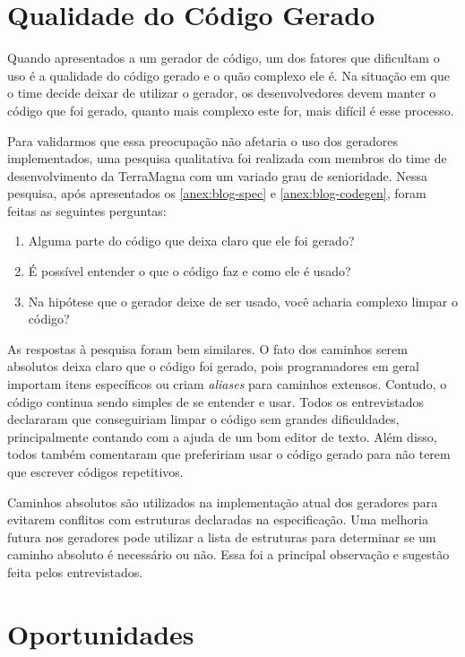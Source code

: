 \section{Qualidade do Código Gerado}

Quando apresentados a um gerador de código, um dos fatores que dificultam o uso é a qualidade
do código gerado e o quão complexo ele é. Na situação em que o time decide deixar de utilizar
o gerador, os desenvolvedores devem manter o código que foi gerado, quanto mais complexo este
for, mais difícil é esse processo.

Para validarmos que essa preocupação não afetaria o uso dos geradores implementados, uma
pesquisa qualitativa foi realizada com membros do time de desenvolvimento da TerraMagna com
um variado grau de senioridade. Nessa pesquisa, após apresentados os \cref{anex:blog-spec} e
\cref{anex:blog-codegen}, foram feitas as seguintes perguntas:

\begin{enumerate}
\item Alguma parte do código que deixa claro que ele foi gerado?
\item É possível entender o que o código faz e como ele é usado?
\item Na hipótese que o gerador deixe de ser usado, você acharia complexo limpar o código?
\end{enumerate}

As respostas à pesquisa foram bem similares. O fato dos caminhos serem absolutos deixa claro
que o código foi gerado, pois programadores em geral importam itens específicos ou criam
\textit{aliases} para caminhos extensos. Contudo, o código continua sendo simples de se
entender e usar. Todos os entrevistados declararam que conseguiriam limpar o código sem
grandes dificuldades, principalmente contando com a ajuda de um bom editor de texto. Além
disso, todos também comentaram que prefeririam usar o código gerado para não terem que
escrever códigos repetitivos.

Caminhos absolutos são utilizados na implementação atual dos geradores para evitarem conflitos
com estruturas declaradas na especificação. Uma melhoria futura nos geradores pode utilizar a
lista de estruturas para determinar se um caminho absoluto é necessário ou não. Essa foi a
principal observação e sugestão feita pelos entrevistados.

\section{Oportunidades}

